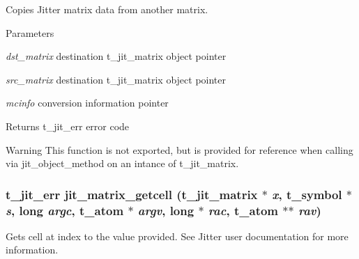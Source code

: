 Copies Jitter matrix data from another matrix. 
\begin{DoxyParams}{Parameters}
\item[{\em dst\_\-matrix}]destination t\_\-jit\_\-matrix object pointer \item[{\em src\_\-matrix}]destination t\_\-jit\_\-matrix object pointer \item[{\em mcinfo}]conversion information pointer\end{DoxyParams}
\begin{DoxyReturn}{Returns}
t\_\-jit\_\-err error code
\end{DoxyReturn}
\begin{DoxyWarning}{Warning}
This function is not exported, but is provided for reference when calling via jit\_\-object\_\-method on an intance of t\_\-jit\_\-matrix. 
\end{DoxyWarning}
\hypertarget{group__matrixmod_ga5e42c3fe24bf48e8fda494a26ead2f6d}{
\subsubsection[{jit\_\-matrix\_\-getcell}]{\setlength{\rightskip}{0pt plus 5cm}t\_\-jit\_\-err jit\_\-matrix\_\-getcell (t\_\-jit\_\-matrix $\ast$ {\em x}, \/  {\bf t\_\-symbol} $\ast$ {\em s}, \/  long {\em argc}, \/  {\bf t\_\-atom} $\ast$ {\em argv}, \/  long $\ast$ {\em rac}, \/  {\bf t\_\-atom} $\ast$$\ast$ {\em rav})}}
\label{group__matrixmod_ga5e42c3fe24bf48e8fda494a26ead2f6d}


Gets cell at index to the value provided. See Jitter user documentation for more information.


